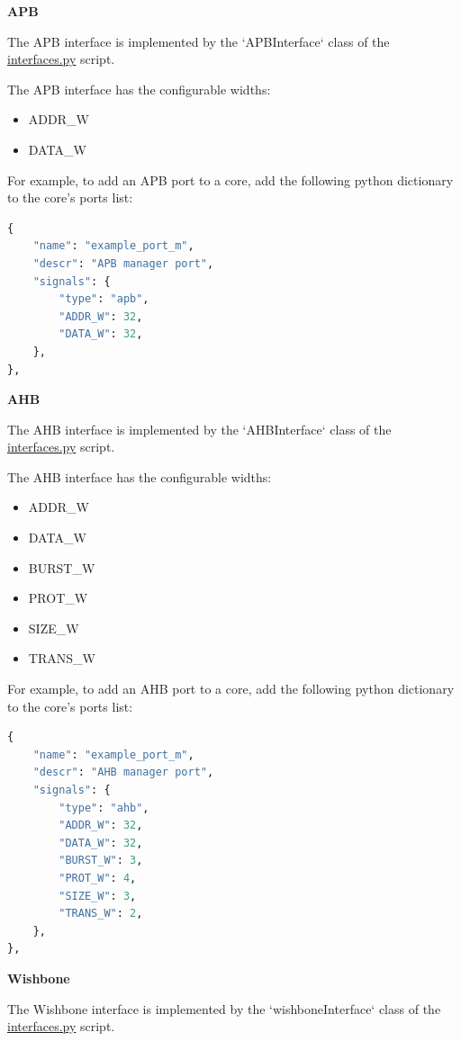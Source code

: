 %
%
\clearpage
\large\textbf{APB}

The APB interface is implemented by the `APBInterface` class of the \href{https://github.com/IObundle/py2hwsw/blob/main/py2hwsw/scripts/interfaces.py}{interfaces.py} script.


The APB interface has the configurable widths:
\begin{itemize}
  \item ADDR\_W
  \item DATA\_W
\end{itemize}

For example, to add an APB port to a core, add the following python dictionary to the core's ports list:
\begin{lstlisting}[language=python]
{
	"name": "example_port_m",
	"descr": "APB manager port",
	"signals": {
		"type": "apb",
		"ADDR_W": 32,
		"DATA_W": 32,
	},
},
\end{lstlisting}


%
%
\clearpage
\large\textbf{AHB}

The AHB interface is implemented by the `AHBInterface` class of the \href{https://github.com/IObundle/py2hwsw/blob/main/py2hwsw/scripts/interfaces.py}{interfaces.py} script.


The AHB interface has the configurable widths:
\begin{itemize}
  \item ADDR\_W
  \item DATA\_W
  \item BURST\_W
  \item PROT\_W
  \item SIZE\_W
  \item TRANS\_W
\end{itemize}

For example, to add an AHB port to a core, add the following python dictionary to the core's ports list:
\begin{lstlisting}[language=python]
{
	"name": "example_port_m",
	"descr": "AHB manager port",
	"signals": {
		"type": "ahb",
		"ADDR_W": 32,
		"DATA_W": 32,
		"BURST_W": 3,
		"PROT_W": 4,
		"SIZE_W": 3,
		"TRANS_W": 2,
	},
},
\end{lstlisting}


%
%
\clearpage
\large\textbf{Wishbone}

The Wishbone interface is implemented by the `wishboneInterface` class of the \href{https://github.com/IObundle/py2hwsw/blob/main/py2hwsw/scripts/interfaces.py}{interfaces.py} script.

